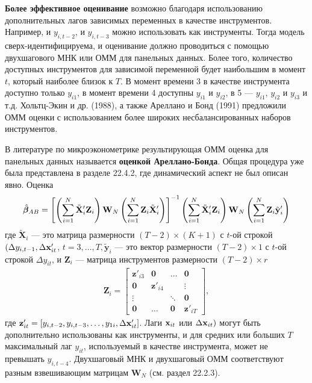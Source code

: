\textbf{Более эффективное оценивание} возможно благодаря использованию дополнительных лагов зависимых переменных в качестве инструментов. Например, и $y_{i,t-2}$, и $y_{i,t-3}$ можно использовать как инструменты. Тогда модель сверх-идентифицируема, и оценивание должно проводиться с помощью двухшагового МНК или ОММ для панельных данных. Более того, количество доступных инструментов для зависимой переменной будет наибольшим в момент $t$, который наиболее близок к $T$. В момент времени 3 в качестве инструмента доступно только $y_{i1}$, в момент времени 4 доступны  $y_{i1}$ и  $y_{i2}$, в 5 ---  $y_{i1}$,  $y_{i2}$
 и  $y_{i3}$ и т.д. Хольтц-Экин и др. (1988), а также  Ареллано и Бонд (1991) предложили ОММ оценки с использованием более широких несбалансированных наборов инструментов.

В литературе по микроэконометрике результирующая ОММ оценка для панельных данных называется \textbf{оценкой Ареллано-Бонда}. Общая процедура уже была представлена в разделе 22.4.2, где динамический аспект не был описан явно. Оценка
\begin{align}
\hat{\bm{\beta}}_{AB}=\left[ \left( \sum^N_{i=1} \tilde{\mathbf X}'_i \mathbf Z_i \right) \mathbf W_N
\left( \sum^N_{i=1} \mathbf Z_i  \tilde{\mathbf X}'_i \right) \right]^{-1}
\left( \sum^N_{i=1} \tilde{\mathbf X}'_i \mathbf Z_i \right) \mathbf W_N
\left( \sum^N_{i=1} \mathbf Z_i  \tilde{\mathbf y}'_i \right)
\label{Eq:22.35}
\end{align}
где $\tilde{\mathbf X}_i$ --- это матрица размерности $(T-2) \times (K +1)$ с $t$-ой строкой $(\Delta y_{i,t-1}, \Delta \mathbf{x}'_{it}$, $t=3, \dots, T, \tilde{\mathbf y}_i$ --- это вектор размерности $(T-2) \times 1$ с $t$-ой строкой $\Delta y_{it}$, и $\mathbf Z_i$  --- матрица инструментов размерности $(T-2) \times r$
\begin{align}
\mathbf Z_i=
\begin{bmatrix}
\mathbf z'_{i3} & \mathbf 0 & \dots & \mathbf 0 \\
\mathbf 0 & \mathbf z'_{i4} & & \vdots \\
\vdots & & \ddots & \mathbf 0 \\
\mathbf 0 & \dots & \mathbf 0 & \mathbf z'_{iT} 
\end{bmatrix},
\label{Eq:22.36}
\end{align}
где $\mathbf z'_{it} = [y_{i,t-2}, y_{i,t-3}, \dots, y_{1i}, \Delta \mathbf{x}'_{it}]$. Лаги $\mathbf{x}_{it}$ или $\Delta \mathbf{x}_{it})$ могут быть дополнительно использованы как инструменты, и для средних или больших $T$ максимальный лаг $y_{it}$, используемый в качестве инструмента, может не превышать $y_{i,t-4}$. Двухшаговый МНК и двухшаговый ОММ соответствуют разным взвешивающим матрицам $\mathbf W_N$ (см. раздел 22.2.3).

